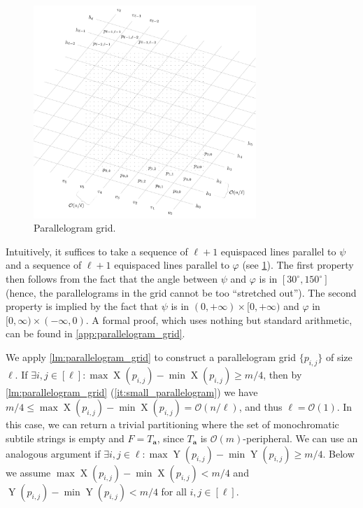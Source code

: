 \documentclass[twoside,leqno]{article}
\let\Cref\cref
\renewcommand{\O}{\mathcal{O}}
\newcommand{\Ta}{T_\mathbf{a}}
\renewcommand{\phi}{\varphi}
\DeclareMathOperator*{\X}{X}
\DeclareMathOperator*{\Y}{Y}
\begin{document}
\begin{figure}
        \centering
        \includegraphics[width=0.75\textwidth]{drawings/lemma5}
        \caption{Parallelogram grid.}
        \label{figure:lemma5}
\end{figure}

Intuitively, it suffices to take a sequence of $\ell+1$ equispaced lines parallel to $\psi$ and a sequence of $\ell+1$ equispaced lines parallel to $\phi$ (see \cref{figure:lemma5}). The first property then follows from the fact that the angle between $\psi$ and $\varphi$ is in $[30^\circ,150^\circ]$ (hence, the parallelograms in the grid cannot be too ``stretched out''). The second property is implied by the fact that $\psi$ is in $(0,+\infty)\times [0,+\infty)$ and $\phi$ in $[0,\infty) \times (-\infty,0)$. A formal proof, which uses nothing but standard arithmetic, can be found in \cref{app:parallelogram_grid}.  

We apply \Cref{lm:parallelogram_grid} to construct a parallelogram grid $\{p_{i,j}\}$ of size $\ell$. If $\exists i, j \in [\ell] : \max \X(p_{i, j}) - \min \X(p_{i, j}) \ge m / 4$, then by \Cref{lm:parallelogram_grid} (\ref{it:small_parallelogram}) we have $m / 4 \le \max \X(p_{i, j}) - \min \X(p_{i, j}) = \O(n / \ell)$, and thus $\ell = \O(1)$. In this case, we can return a trivial partitioning where the set of monochromatic subtile strings is empty and $F = \Ta$, since $\Ta$ is $\O(m)$-peripheral. We can use an analogous argument if $\exists i,j \in \ell : \max \Y(p_{i, j}) - \min \Y(p_{i, j}) \ge m / 4$. Below we assume $\max \X(p_{i, j}) - \min \X(p_{i, j}) < m / 4$ and $\Y(p_{i, j}) - \min \Y(p_{i, j}) < m / 4$ for all $i, j \in [\ell]$. 
\end{document}
